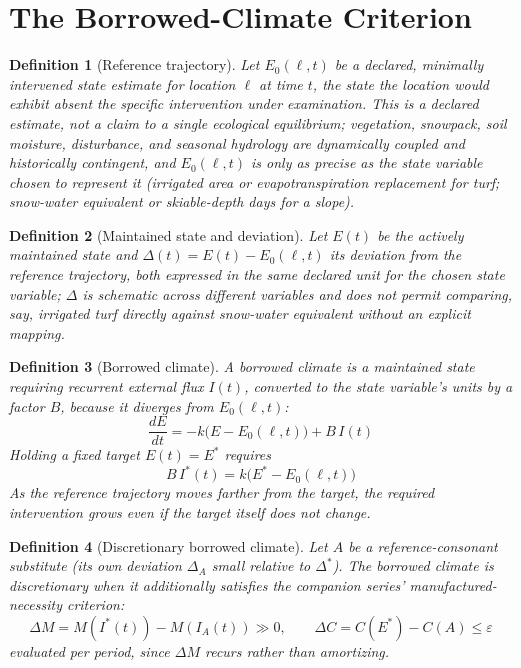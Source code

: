 \documentclass[11pt]{article}
\newtheorem{definition}{Definition}[section]
\begin{document}
\section{The Borrowed-Climate Criterion}

\begin{definition}[Reference trajectory]
Let $E_0(\ell,t)$ be a declared, minimally intervened state estimate for location $\ell$ at time $t$, the state the location would exhibit absent the specific intervention under examination. This is a declared estimate, not a claim to a single ecological equilibrium; vegetation, snowpack, soil moisture, disturbance, and seasonal hydrology are dynamically coupled and historically contingent, and $E_0(\ell,t)$ is only as precise as the state variable chosen to represent it (irrigated area or evapotranspiration replacement for turf; snow-water equivalent or skiable-depth days for a slope).
\end{definition}

\begin{definition}[Maintained state and deviation]
Let $E(t)$ be the actively maintained state and $\Delta(t) = E(t) - E_0(\ell,t)$ its deviation from the reference trajectory, both expressed in the same declared unit for the chosen state variable; $\Delta$ is schematic across different variables and does not permit comparing, say, irrigated turf directly against snow-water equivalent without an explicit mapping.
\end{definition}

\begin{definition}[Borrowed climate]
A borrowed climate is a maintained state requiring recurrent external flux $I(t)$, converted to the state variable's units by a factor $B$, because it diverges from $E_0(\ell,t)$:
\[
\frac{dE}{dt} = -k\big(E - E_0(\ell,t)\big) + B\,I(t)
\]
Holding a fixed target $E(t) = E^{*}$ requires
\[
B\,I^{*}(t) = k\big(E^{*} - E_0(\ell,t)\big)
\]
As the reference trajectory moves farther from the target, the required intervention grows even if the target itself does not change.
\end{definition}

\begin{definition}[Discretionary borrowed climate]
Let $A$ be a reference-consonant substitute (its own deviation $\Delta_A$ small relative to $\Delta^{*}$). The borrowed climate is \emph{discretionary} when it additionally satisfies the companion series' manufactured-necessity criterion:
\[
\Delta M = M(I^{*}(t)) - M(I_A(t)) \gg 0, \qquad \Delta C = C(E^{*}) - C(A) \leq \varepsilon
\]
evaluated per period, since $\Delta M$ recurs rather than amortizing.
\end{definition}
\end{document}
